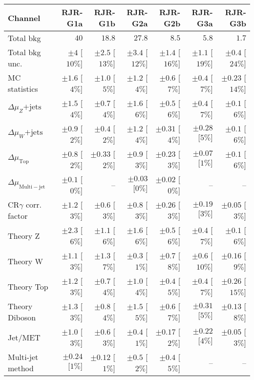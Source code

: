 \begin{table}[H]
\begin{center}
\begin{tabular}{|lrrrrrr|}
\hline
Channel  &  \textbf{ RJR-G1a } & \textbf{ RJR-G1b } & \textbf{ RJR-G2a } & \textbf{ RJR-G2b } & \textbf{ RJR-G3a } & \textbf{ RJR-G3b }  \\ \hline
Total bkg  &  $40$  &  $18.8$  &  $27.8$  &  $8.5$  &  $5.8$  &  $1.7$ \\
Total bkg unc.  &  $\pm 4$  [$10\%$]  &  $\pm 2.5$  [$13\%$]  &  $\pm 3.4$  [$12\%$]  &  $\pm 1.4$  [$16\%$]  &  $\pm 1.1$  [$19\%$]  &  $\pm 0.4$  [$24\%$] \\
\hline
MC statistics  &  $\pm 1.6$ [$4\%$]  &  $\pm 1.0$ [$5\%$]  &  $\pm 1.2$ [$4\%$]  &  $\pm 0.6$ [$7\%$]  &  $\pm 0.4$ [$7\%$]  &  $\pm 0.23$ [$14\%$] \\
$\Delta\mu_Z\mathrm{+jets}$  &  $\pm 1.5$ [$4\%$]  &  $\pm 0.7$ [$4\%$]  &  $\pm 1.6$ [$6\%$]  &  $\pm 0.5$ [$6\%$]  &  $\pm 0.4$ [$7\%$]  &  $\pm 0.1$ [$6\%$] \\
$\Delta\mu_W\mathrm{+jets}$  &  $\pm 0.9$ [$2\%$]  &  $\pm 0.4$ [$2\%$]  &  $\pm 1.2$ [$4\%$]  &  $\pm 0.31$ [$4\%$]  &  $\pm 0.28$ [$5\%$]  &  $\pm 0.1$ [$6\%$] \\
$\Delta\mu_\mathrm{ Top}$  &  $\pm 0.8$ [$2\%$]  &  $\pm 0.33$ [$2\%$]  &  $\pm 0.9$ [$3\%$]  &  $\pm 0.23$ [$3\%$]  &  $\pm 0.07$ [$1\%$]  &  $\pm 0.1$ [$6\%$] \\
$\Delta\mu_\mathrm{ Multi-jet}$  &  $\pm 0.1$ [$0\%$]  &  --  &  $\pm 0.03$ [$0\%$]  &  $\pm 0.02$ [$0\%$]  &   --    &   --   \\
CR$\gamma$ corr. factor  &  $\pm 1.2$ [$3\%$]  &  $\pm 0.6$ [$3\%$]  &  $\pm 0.8$ [$3\%$]  &  $\pm 0.26$ [$3\%$]  &  $\pm 0.19$ [$3\%$]  &  $\pm 0.05$ [$3\%$] \\
Theory Z  &  $\pm 2.3$ [$6\%$]  &  $\pm 1.1$ [$6\%$]  &  $\pm 1.6$ [$6\%$]  &  $\pm 0.5$ [$6\%$]  &  $\pm 0.4$ [$7\%$]  &  $\pm 0.1$ [$6\%$] \\
Theory W  &  $\pm 1.1$ [$3\%$]  &  $\pm 1.3$ [$7\%$]  &  $\pm 0.3$ [$1\%$]  &  $\pm 0.7$ [$8\%$]  &  $\pm 0.6$ [$10\%$]  &  $\pm 0.16$ [$9\%$] \\
Theory Top   &  $\pm 1.2$ [$3\%$]  &  $\pm 0.7$ [$4\%$]  &  $\pm 1.0$ [$4\%$]  &  $\pm 0.4$ [$5\%$]  &  $\pm 0.4$ [$7\%$]  &  $\pm 0.26$ [$15\%$] \\
Theory Diboson  &  $\pm 1.3$ [$3\%$]  &  $\pm 0.8$ [$4\%$]  &  $\pm 1.5$ [$5\%$]  &  $\pm 0.6$ [$7\%$]  &  $\pm 0.31$ [$5\%$]  &  $\pm 0.13$ [$8\%$] \\
Jet/MET   &  $\pm 1.0$ [$3\%$]  &  $\pm 0.6$ [$3\%$]  &  $\pm 0.4$ [$1\%$]  &  $\pm 0.17$ [$2\%$]  &  $\pm 0.22$ [$4\%$]  &  $\pm 0.05$ [$3\%$] \\
Multi-jet method  &  $\pm 0.24$ [$1\%$]  &  $\pm 0.12$ [$1\%$]  &  $\pm 0.5$ [$2\%$]  &  $\pm 0.4$ [$5\%$]  &   --    &   --   \\
\hline
\end{tabular}


\end{center}
\end{table}
